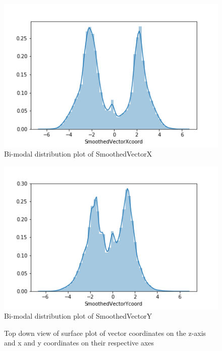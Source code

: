 \documentclass[bsc,frontabs,twoside,singlespacing,parskip,deptreport]{infthesis}     %
\begin{document}
\begin{figure}
    \centering
    \includegraphics[scale=0.6]{report/images/vectorxhist.png}
    \caption{Bi-modal distribution plot of SmoothedVectorX}
    \label{fig:distx}
\end{figure}

\begin{figure}
    \centering
    \includegraphics[scale=0.6]{report/images/vectoryhist.png}
    \caption{Bi-modal distribution plot of SmoothedVectorY}
    \label{fig:disty}
\end{figure}

\begin{figure}
    \centering
    \caption{Top down view of surface plot of vector coordinates on the z-axis and x and y coordinates on their respective axes}
    \label{fig:surface3d}
\end{figure}
\end{document}
